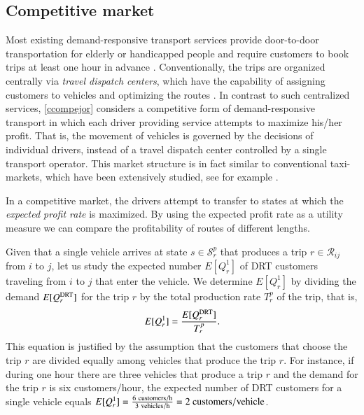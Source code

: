 \documentclass[dissertation,draft*]{aaltoseries}
\begin{document}
\subsection{Competitive market}
\label{compdescription}
Most existing demand-responsive transport services provide door-to-door transportation for elderly or handicapped people
and require customers to book trips at least one hour in advance \citep{cordeau05,jouko}.
Conventionally, the trips are organized centrally via \emph{travel dispatch centers}, which have the capability of
assigning customers to vehicles and optimizing the routes \citep{mageean}.
In contrast to such centralized services, \ref{ccompejor} considers a competitive form of demand-responsive transport in which 
each driver providing service attempts to maximize his/her profit. That is,
the movement of vehicles is governed by the decisions of individual drivers, 
instead of a travel dispatch center controlled by a single transport operator.
This market structure is in fact similar to conventional taxi-markets, which have been extensively studied, see for example 
\citep{hackner1995,arnott1996,cairns1996,flores-guri2003,lagos2003,wong2005,matsushima2006,fernandez2006,moore2006,yang2002,yang2005,yang2010}.

In a competitive market, the drivers attempt to transfer to
states at which the \emph{expected profit rate} is maximized. By using the expected profit rate as a 
utility measure we can compare the profitability of routes of different lengths.

Given that a single vehicle arrives at state $s \in \mathcal{S}_{r}^p$ that 
produces a trip $r \in \mathcal{R}_{ij}$ from $i$ to $j$, 
let us study the expected number $E[Q_{r}^1]$ of DRT customers traveling 
from $i$ to $j$ that enter the vehicle.
We determine $E[Q_{r}^1]$ by
dividing the demand $E[Q_{r}^{\rm DRT}]$ for the trip $r$ by the total production rate $T_r^p$ of 
the trip, that is,
\begin{align}
E[Q_{r}^1] = \frac{E[Q_{r}^{\rm DRT}]}{ T_{r}^p}.
\end{align}
This equation is justified by the assumption that the customers
that choose the trip $r$ are divided equally among
vehicles that produce the trip $r$.
For instance, if during one hour there are three vehicles that produce a trip $r$ and the demand
for the trip $r$ is six customers/hour, the expected number of DRT customers
for a single vehicle equals $E[Q_{r}^1] = \frac{6 \ {\rm customers/h}}{3 \ {\rm vehicles/h}} = 2 \ {\rm customers/vehicle}$.
\end{document}
